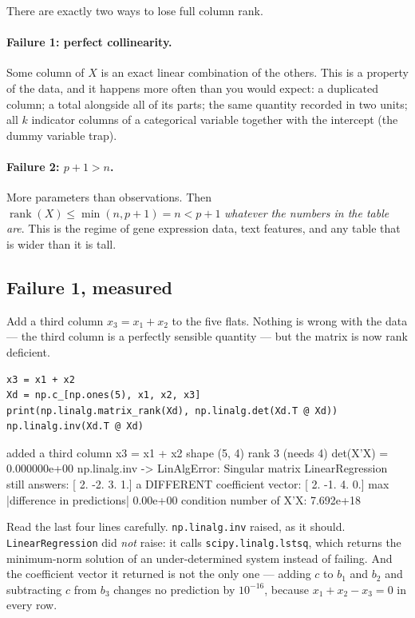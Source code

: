 \documentclass[11pt]{article}
\begin{document}
There are exactly two ways to lose full column rank.

\paragraph{Failure 1: perfect collinearity.} Some column of $X$ is an exact
linear combination of the others. This is a property of the data, and it
happens more often than you would expect: a duplicated column; a total
alongside all of its parts; the same quantity recorded in two units; all $k$
indicator columns of a categorical variable together with the intercept (the
dummy variable trap).

\paragraph{Failure 2: $p + 1 > n$.} More parameters than observations. Then
$\operatorname{rank}(X) \le \min(n, p+1) = n < p+1$ \emph{whatever the numbers
in the table are}. This is the regime of gene expression data, text features,
and any table that is wider than it is tall.

\subsection{Failure 1, measured}
\label{sec:fail1}

Add a third column $x_3 = x_1 + x_2$ to the five flats. Nothing is wrong with
the data --- the third column is a perfectly sensible quantity --- but the
matrix is now rank deficient.

\begin{lstlisting}
x3 = x1 + x2
Xd = np.c_[np.ones(5), x1, x2, x3]
print(np.linalg.matrix_rank(Xd), np.linalg.det(Xd.T @ Xd))
np.linalg.inv(Xd.T @ Xd)
\end{lstlisting}
\begin{codeout}
added a third column x3 = x1 + x2
shape (5, 4)  rank 3  (needs 4)
det(X'X) = 0.000000e+00
np.linalg.inv  ->  LinAlgError: Singular matrix
LinearRegression still answers: [ 2. -2.  3.  1.]
a DIFFERENT coefficient vector: [ 2. -1.  4.  0.]
max |difference in predictions| 0.00e+00
condition number of X'X: 7.692e+18
\end{codeout}

Read the last four lines carefully. \texttt{np.linalg.inv} raised, as it
should. \texttt{LinearRegression} did \emph{not} raise: it calls
\texttt{scipy.linalg.lstsq}, which returns the minimum-norm solution of an
under-determined system instead of failing. And the coefficient vector it
returned is not the only one --- adding $c$ to $b_1$ and $b_2$ and subtracting
$c$ from $b_3$ changes no prediction by $10^{-16}$, because
$x_1 + x_2 - x_3 = 0$ in every row.
\end{document}
